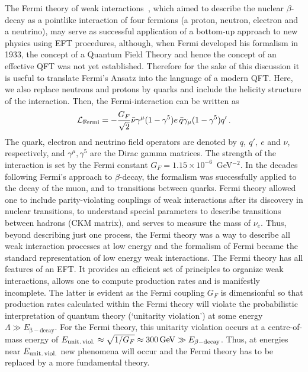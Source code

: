 The Fermi theory of weak interactions~\citep{Fermi1934}, which aimed to describe the nuclear $\beta $-decay
as a pointlike interaction of four fermions (a proton, neutron, electron and a neutrino),
may serve as successful application of  a bottom-up approach to new physics using EFT procedures,
although, when Fermi developed his formalism in 1933, the concept of a
Quantum Field Theory and hence the concept of an effective QFT was not
yet established. Therefore for the sake of this discussion it is useful to translate Fermi's Ansatz
into the language of a modern QFT.
Here, we also replace neutrons and protons by quarks and include the 
helicity structure of the interaction. Then, the Fermi-interaction can
be written as
\begin{equation}\label{eq:Fermi}
{\cal L}_{\rm Fermi} = -\frac{G_F}{\sqrt2}\bar\nu\gamma^\mu(1-\gamma^5)e\,\bar q\gamma_\mu(1-\gamma^5)q'\,.
\end{equation}
The quark, electron and neutrino field operators are denoted by $q,\ q',\ e$ and $\nu$, respectively, and $\gamma^\mu, \gamma^5$ are the Dirac gamma matrices. 
The strength of the interaction is set by the Fermi constant $G_F = 1.15 \times 10^{-6}$~GeV$^{-2}$. 
In the decades following Fermi's approach to $\beta $-decay, the formalism  was successfully applied to the decay of the muon, and  to transitions between quarks. 
Fermi theory allowed one to include parity-violating couplings of weak interactions after its discovery in nuclear transitions, to understand special parameters to describe transitions between hadrons (CKM matrix), and serves to measure the mass of $\nu_e$. 
Thus, beyond describing just one process, the Fermi theory was a way to describe all weak interaction processes at low energy and the formalism of Fermi became the standard representation of low energy weak interactions. 
The Fermi theory has all features of an EFT. It provides an efficient
set of principles to organize weak interactions, allows one to compute
production rates and is manifestly incomplete. The latter is evident
as the Fermi coupling $G_F$ is dimensionful so that production rates
calculated within the Fermi theory will violate the probabilistic
interpretation of quantum theory (`unitarity violation') at
some energy $\Lambda \gg E_{\mathrm{\beta-decay}}$. For the Fermi
theory, this unitarity violation occurs at a centre-of-mass energy of
$E_{\rm unit.\, viol.}\approx \sqrt{1/G_F} \approx
300\,\mathrm{GeV}\gg E_{\mathrm{\beta-decay}}$. Thus, at energies near
$E_{\rm unit.\, viol.}$ new phenomena will occur and the Fermi theory
has to be replaced by a more fundamental theory. 

